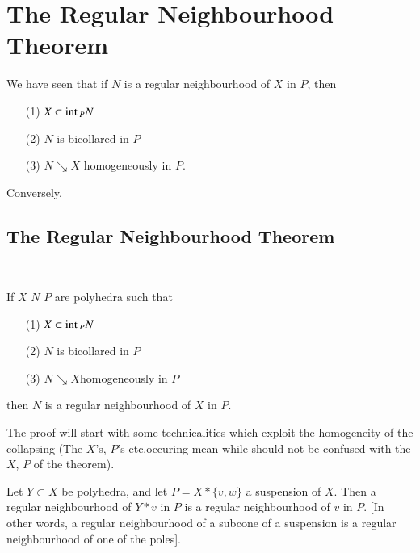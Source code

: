 \section{The Regular Neighbourhood Theorem}\label{chap6-sec6.8}

We have seen that if $N$ is a regular neighbourhood of $X$ in $P$, then
\begin{itemize}
\item[(1)] $X\subset \text{int\,}_{P}N$

\item[(2)] $N$ is bicollared in $P$

\item[(3)] $N\searrow X$ homogeneously in $P$.
\end{itemize}

Conversely.

\subsection{The Regular Neighbourhood Theorem}\label{chap6-sec6.8.1}

\phantom{a}~

If $X$ $N$ $P$ are polyhedra such that 
\begin{itemize}
\item[(1)] $X\subset \text{int\,}_{P}N$

\item[(2)] $N$ is bicollared in $P$

\item[(3)] $N\searrow X$\pageoriginale homogeneously in $P$
\end{itemize}
\noindent
then $N$ is a regular neighbourhood of $X$ in $P$.

The proof will start with some technicalities which exploit the homogeneity of the collapsing (The $X$'s, $P$'s etc.\@ occuring mean-while should not be confused with the $X$, $P$ of the theorem).

\setcounter{proposition}{1}
\begin{proposition}\label{chap6-prop6.8.2}
Let $Y\subset X$ be polyhedra, and let $P=X\ast\{v,w\}$ a suspension of $X$. Then a regular neighbourhood of $Y\ast v$ in $P$ is a regular neighbourhood of $v$ in $P$. [In other words, a regular neighbourhood of a subcone of a suspension is a regular neighbourhood of one of the poles].
\end{proposition}

